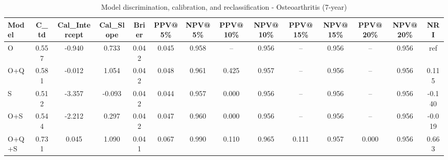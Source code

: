 \begin{table}[htbp]
\centering
\small
\caption{Model discrimination, calibration, and reclassification - Osteoarthritis (7-year)}
\label{tab:perf_osteoarthritis_7y}
\begin{tabular}{lccccccccccccc}
\toprule
Model & C\_td & Cal\_Intercept & Cal\_Slope & Brier & PPV@5\% & NPV@5\% & PPV@10\% & NPV@10\% & PPV@15\% & NPV@15\% & PPV@20\% & NPV@20\% & NRI \\
\midrule
O & 0.557 & -0.940 & 0.733 & 0.042 & 0.045 & 0.958 & -- & 0.956 & -- & 0.956 & -- & 0.956 & ref \\
O+Q & 0.581 & -0.012 & 1.054 & 0.042 & 0.048 & 0.961 & 0.425 & 0.957 & -- & 0.956 & -- & 0.956 & 0.115 \\
S & 0.512 & -3.357 & -0.093 & 0.042 & 0.044 & 0.957 & 0.000 & 0.956 & -- & 0.956 & -- & 0.956 & -0.140 \\
O+S & 0.544 & -2.212 & 0.297 & 0.042 & 0.047 & 0.960 & 0.000 & 0.956 & -- & 0.956 & -- & 0.956 & -0.019 \\
O+Q+S & 0.731 & 0.045 & 1.090 & 0.041 & 0.067 & 0.990 & 0.110 & 0.965 & 0.111 & 0.957 & 0.000 & 0.956 & 0.663 \\
\bottomrule
\end{tabular}
\end{table}